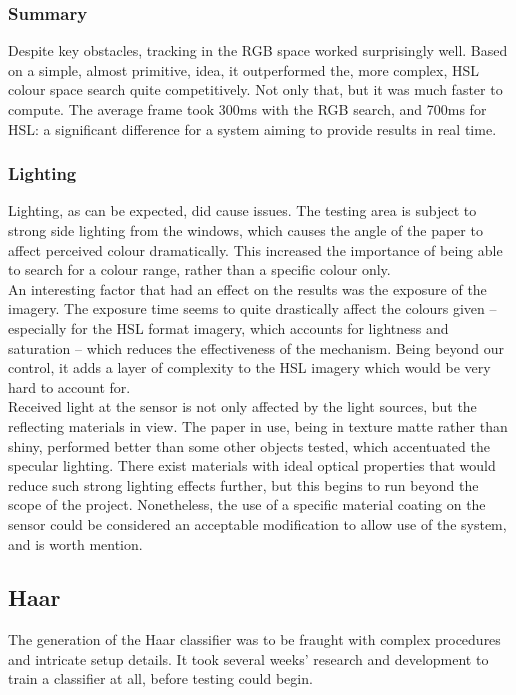 \subsubsection{Summary}
Despite key obstacles, tracking in the RGB space worked surprisingly well. Based on a simple, almost primitive, idea, it outperformed the, more complex, HSL colour space search quite competitively. Not only that, but it was much faster to compute. The average frame took 300ms with the RGB search, and 700ms for HSL: a significant difference for a system aiming to provide results in real time.\\

\subsubsection{Lighting}
Lighting, as can be expected, did cause issues. The testing area is subject to strong side lighting from the windows, which causes the angle of the paper to affect perceived colour dramatically. This increased the importance of being able to search for a colour range, rather than a specific colour only.\\

An interesting factor that had an effect on the results was the exposure of the imagery. The exposure time seems to quite drastically affect the colours given – especially for the HSL format imagery, which accounts for lightness and saturation – which reduces the effectiveness of the mechanism. Being beyond our control, it adds a layer of complexity to the HSL imagery which would be very hard to account for.\\

Received light at the sensor is not only affected by the light sources, but the reflecting materials in view. The paper in use, being in texture matte rather than shiny, performed better than some other objects tested, which accentuated the specular lighting. There exist materials with ideal optical properties that would reduce such strong lighting effects further, but this begins to run beyond the scope of the project. Nonetheless, the use of a specific material coating on the sensor could be considered an acceptable modification to allow use of the system, and is worth mention.\\


\subsection{Haar}
The generation of the Haar classifier was to be fraught with complex procedures and intricate setup details. It took several weeks’ research and development to train a classifier at all, before testing could begin.\\

